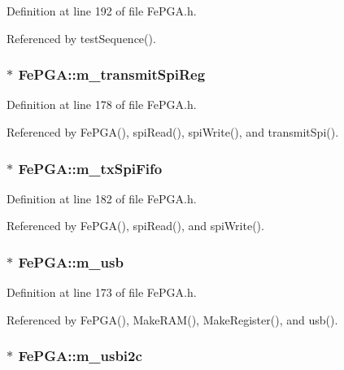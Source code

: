 Definition at line 192 of file FePGA.h.

Referenced by testSequence().\hypertarget{classFePGA_a003ee241fb5f32fb3442174db3fe6f49}{
\subsubsection[{m\_\-transmitSpiReg}]{$\ast$ {\bf FePGA::m\_\-transmitSpiReg}}}
\label{classFePGA_a003ee241fb5f32fb3442174db3fe6f49}


Definition at line 178 of file FePGA.h.

Referenced by FePGA(), spiRead(), spiWrite(), and transmitSpi().\hypertarget{classFePGA_a5b3e4deb73a882e6f044450d8a733558}{
\subsubsection[{m\_\-txSpiFifo}]{$\ast$ {\bf FePGA::m\_\-txSpiFifo}}}
\label{classFePGA_a5b3e4deb73a882e6f044450d8a733558}


Definition at line 182 of file FePGA.h.

Referenced by FePGA(), spiRead(), and spiWrite().\hypertarget{classFePGA_afb7947e600a66d914ee524acec3d8b1f}{
\subsubsection[{m\_\-usb}]{$\ast$ {\bf FePGA::m\_\-usb}}}
\label{classFePGA_afb7947e600a66d914ee524acec3d8b1f}


Definition at line 173 of file FePGA.h.

Referenced by FePGA(), MakeRAM(), MakeRegister(), and usb().\hypertarget{classFePGA_a09fdde4002008daa0d15672772dd4483}{
\subsubsection[{m\_\-usbi2c}]{$\ast$ {\bf FePGA::m\_\-usbi2c}}}
\label{classFePGA_a09fdde4002008daa0d15672772dd4483}


